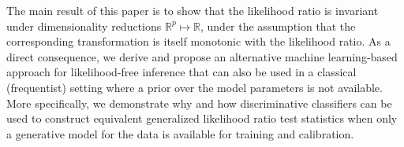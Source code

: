 \documentclass[12pt]{article}
\numberwithin{equation}{section}
\theoremstyle{plain}
\begin{document}
The main result of this paper is to show that the likelihood ratio is invariant
under dimensionality reductions $\mathbb{R}^p \mapsto \mathbb{R}$, under the assumption that the corresponding
transformation is itself monotonic with the likelihood ratio. As a direct consequence,
we derive and propose an alternative machine learning-based approach for
likelihood-free inference that can also be used in a classical (frequentist)
setting where a prior over the model parameters is not available. More
specifically, we demonstrate why and how discriminative classifiers can be used
to construct equivalent generalized likelihood ratio test statistics when only a generative model for
the data is available for training and calibration.

%
%
%
\end{document}
